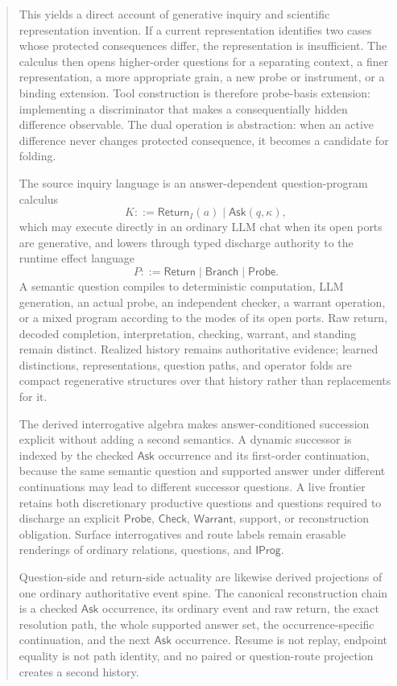 \documentclass[11pt,oneside]{article}
\begin{document}
\begin{abstract}
This yields a direct account of generative inquiry and scientific representation invention.  If a current representation identifies two cases whose protected consequences differ, the representation is insufficient.  The calculus then opens higher-order questions for a separating context, a finer representation, a more appropriate grain, a new probe or instrument, or a binding extension.  Tool construction is therefore probe-basis extension: implementing a discriminator that makes a consequentially hidden difference observable.  The dual operation is abstraction: when an active difference never changes protected consequence, it becomes a candidate for folding.

The source inquiry language is an answer-dependent question-program calculus
\[
K::=\mathsf{Return}_I(a)\mid\mathsf{Ask}(q,\kappa),
\]
which may execute directly in an ordinary LLM chat when its open ports are generative, and lowers through typed discharge authority to the runtime effect language
\[
P::=\mathsf{Return}\mid\mathsf{Branch}\mid\mathsf{Probe}.
\]
A semantic question compiles to deterministic computation, LLM generation, an actual probe, an independent checker, a warrant operation, or a mixed program according to the modes of its open ports.  Raw return, decoded completion, interpretation, checking, warrant, and standing remain distinct.  Realized history remains authoritative evidence; learned distinctions, representations, question paths, and operator folds are compact regenerative structures over that history rather than replacements for it.

The derived interrogative algebra makes answer-conditioned succession explicit without adding a second semantics.  A dynamic successor is indexed by the checked \(\mathsf{Ask}\) occurrence and its first-order continuation, because the same semantic question and supported answer under different continuations may lead to different successor questions.  A live frontier retains both discretionary productive questions and questions required to discharge an explicit \(\mathsf{Probe}\), \(\mathsf{Check}\), \(\mathsf{Warrant}\), support, or reconstruction obligation.  Surface interrogatives and route labels remain erasable renderings of ordinary relations, questions, and \(\mathsf{IProg}\).

Question-side and return-side actuality are likewise derived projections of one ordinary authoritative event spine.  The canonical reconstruction chain is a checked \(\mathsf{Ask}\) occurrence, its ordinary event and raw return, the exact resolution path, the whole supported answer set, the occurrence-specific continuation, and the next \(\mathsf{Ask}\) occurrence.  Resume is not replay, endpoint equality is not path identity, and no paired or question-route projection creates a second history.


\end{abstract}
\end{document}
